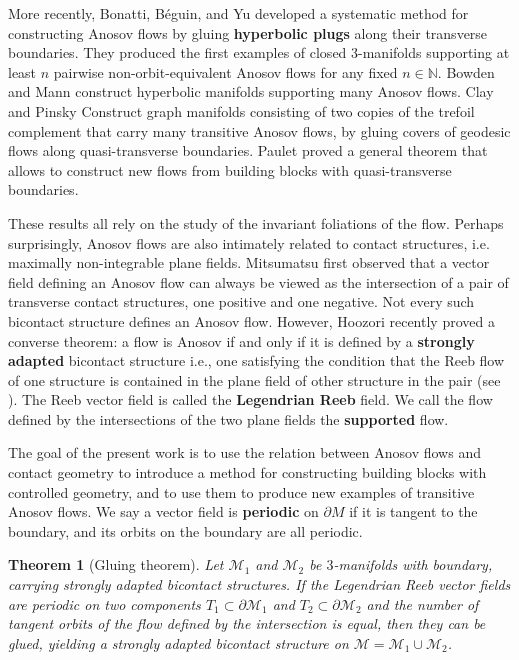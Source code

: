 \documentclass{amsart}
\renewcommand{\emph}{\textbf}
\newtheorem{theorem}{Theorem}[section]
\theoremstyle{definition}
\theoremstyle{remark}
\begin{document}
More recently, Bonatti, B\'{e}guin, and Yu \cite{BeguinBonattiYu2017} developed a systematic method for constructing Anosov flows by gluing \emph{hyperbolic plugs} along their transverse boundaries. They produced the first examples of closed 3-manifolds supporting at least $n$ pairwise non-orbit-equivalent Anosov flows for any fixed $n \in \mathbb{N}$. Bowden and Mann \cite{BowdenMann2022} construct hyperbolic manifolds supporting many Anosov flows. Clay and Pinsky \cite{ClayPinsky2025Graph} Construct graph manifolds consisting of two copies of the trefoil complement that carry many transitive Anosov flows, by gluing covers of geodesic flows along quasi-transverse boundaries. Paulet \cite{Paulet2025} proved a general theorem that allows to construct new flows from building blocks with quasi-transverse boundaries.

These results all rely on the study of the invariant foliations of the flow. Perhaps surprisingly, Anosov flows are also intimately related to contact structures, i.e. maximally non-integrable plane fields. Mitsumatsu \cite{Mitsumatu1995} first observed that a vector field defining an Anosov flow can always be viewed as the intersection of a pair of transverse contact structures, one positive and one negative. Not every such bicontact structure defines an Anosov flow. However, Hoozori recently proved a converse theorem: a flow is Anosov if and only if it is defined by a \emph{strongly adapted} bicontact structure  i.e., one satisfying the condition that the Reeb flow of one structure is contained in the plane field of other structure in the pair (see \cite{Hoz5}). The Reeb vector field is called the \emph{Legendrian Reeb} field.
We call the flow defined by the intersections of the two plane fields the \emph{supported} flow.

The goal of the present work is to use the relation between Anosov flows and contact geometry to introduce a method for constructing building blocks with controlled geometry, and to use them to produce new examples of transitive Anosov flows. We say a vector field is \emph{periodic} on $\partial M$ if it is tangent to the boundary, and its orbits on the boundary are all periodic.

\begin{theorem}[Gluing theorem]
\label{thm: gluing plugs v1}
Let $\mathcal{M}_1$ and $\mathcal{M}_2$ be $3$-manifolds with boundary, carrying strongly adapted bicontact structures. If the Legendrian Reeb vector fields are periodic on two components $T_1\subset\partial\mathcal{M}_1$ and $T_2\subset\partial\mathcal{M}_2$ and the number of tangent orbits of the flow defined by the intersection is equal, then they can be glued, yielding a strongly adapted bicontact structure on $\mathcal{M} = \mathcal{M}_1 \cup \mathcal{M}_2$.
\end{theorem}
\end{document}
